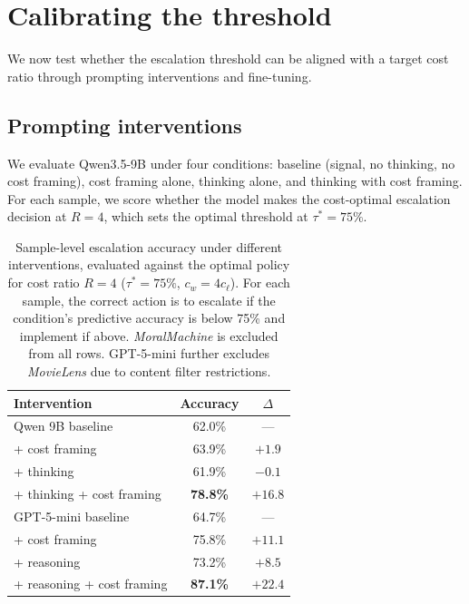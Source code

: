 \documentclass{article}
\begin{document}
\section{Calibrating the threshold}
\label{sec:results3}

We now test whether the escalation threshold can be aligned with a target cost ratio through prompting interventions and fine-tuning.

\subsection{Prompting interventions}

We evaluate Qwen3.5-9B under four conditions: baseline (signal, no thinking, no cost framing), cost framing alone, thinking alone, and thinking with cost framing. For each sample, we score whether the model makes the cost-optimal escalation decision at $R = 4$, which sets the optimal threshold at $\tau^* = 75\%$.

\begin{table}[t]
    \centering
    \caption{Sample-level escalation accuracy under different interventions, evaluated against the optimal policy for cost ratio $R = 4$ ($\tau^* = 75\%$, $c_w = 4 c_\ell$). For each sample, the correct action is to escalate if the condition's predictive accuracy is below 75\% and implement if above. \emph{MoralMachine} is excluded from all rows. GPT-5-mini further excludes \emph{MovieLens} due to content filter restrictions.}
    \label{tab:interventions}
    \begin{tabular}{lcc}
        \toprule
        Intervention & Accuracy & $\Delta$ \\
        \midrule
        Qwen 9B baseline & 62.0\% & --- \\
        \quad + cost framing & 63.9\% & $+1.9$ \\
        \quad + thinking & 61.9\% & $-0.1$ \\
        \quad + thinking + cost framing & \textbf{78.8\%} & $+16.8$ \\
        \midrule
        GPT-5-mini baseline & 64.7\% & --- \\
        \quad + cost framing & 75.8\% & $+11.1$ \\
        \quad + reasoning & 73.2\% & $+8.5$ \\
        \quad + reasoning + cost framing & \textbf{87.1\%} & $+22.4$ \\
        \bottomrule
    \end{tabular}
\end{table}
\end{document}
